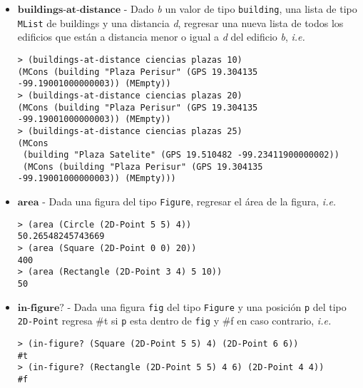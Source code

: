 \documentclass{article}
\begin{document}
\begin{itemize}
\item $\textbf{buildings-at-distance}$ - Dado \textit{b} un valor de tipo \texttt{building}, una lista de tipo \texttt{MList} de buildings y una distancia \textit{d}, regresar una nueva lista de todos los edificios que están a distancia menor o igual a \textit{d} del edificio \textit{b}, \textit{i.e.}
\begin{verbatim}
> (buildings-at-distance ciencias plazas 10)
(MCons (building "Plaza Perisur" (GPS 19.304135 -99.19001000000003)) (MEmpty))
> (buildings-at-distance ciencias plazas 20)
(MCons (building "Plaza Perisur" (GPS 19.304135 -99.19001000000003)) (MEmpty))
> (buildings-at-distance ciencias plazas 25)
(MCons
 (building "Plaza Satelite" (GPS 19.510482 -99.23411900000002))
 (MCons (building "Plaza Perisur" (GPS 19.304135 -99.19001000000003)) (MEmpty)))
\end{verbatim}

\item $\textbf{area}$ - Dada una figura del tipo \texttt{Figure},
  regresar el área de la figura, \textit{i.e.}
\begin{verbatim}
> (area (Circle (2D-Point 5 5) 4))
50.26548245743669
> (area (Square (2D-Point 0 0) 20))
400
> (area (Rectangle (2D-Point 3 4) 5 10))
50
\end{verbatim}

\item $\textbf{in-figure?}$ - Dada una figura \texttt{fig} del tipo \texttt{Figure}
  y una posición \texttt{p} del tipo \texttt{2D-Point} regresa \#t si \texttt{p} esta
  dentro de \texttt{fig} y \#f en caso contrario, \textit{i.e.}
\begin{verbatim}
> (in-figure? (Square (2D-Point 5 5) 4) (2D-Point 6 6))
#t
> (in-figure? (Rectangle (2D-Point 5 5) 4 6) (2D-Point 4 4))
#f
\end{verbatim}

\end{itemize}
\end{document}
